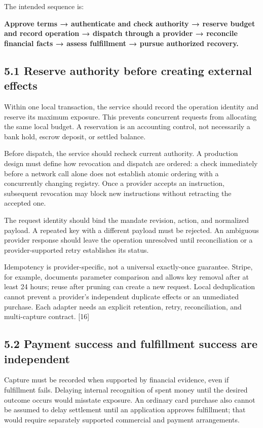 \documentclass[
  11pt,
  letterpaper,
]{article}
\begin{document}
The intended sequence is:

\textbf{Approve terms → authenticate and check authority → reserve
budget and record operation → dispatch through a provider → reconcile
financial facts → assess fulfillment → pursue authorized recovery.}

\subsection{5.1 Reserve authority before creating external
effects}\label{reserve-authority-before-creating-external-effects}

Within one local transaction, the service should record the operation
identity and reserve its maximum exposure. This prevents concurrent
requests from allocating the same local budget. A reservation is an
accounting control, not necessarily a bank hold, escrow deposit, or
settled balance.

Before dispatch, the service should recheck current authority. A
production design must define how revocation and dispatch are ordered: a
check immediately before a network call alone does not establish atomic
ordering with a concurrently changing registry. Once a provider accepts
an instruction, subsequent revocation may block new instructions without
retracting the accepted one.

The request identity should bind the mandate revision, action, and
normalized payload. A repeated key with a different payload must be
rejected. An ambiguous provider response should leave the operation
unresolved until reconciliation or a provider-supported retry
establishes its status.

Idempotency is provider-specific, not a universal exactly-once
guarantee. Stripe, for example, documents parameter comparison and
allows key removal after at least 24 hours; reuse after pruning can
create a new request. Local deduplication cannot prevent a provider's
independent duplicate effects or an unmediated purchase. Each adapter
needs an explicit retention, retry, reconciliation, and multi-capture
contract. {[}16{]}

\subsection{5.2 Payment success and fulfillment success are
independent}\label{payment-success-and-fulfillment-success-are-independent}

Capture must be recorded when supported by financial evidence, even if
fulfillment fails. Delaying internal recognition of spent money until
the desired outcome occurs would misstate exposure. An ordinary card
purchase also cannot be assumed to delay settlement until an application
approves fulfillment; that would require separately supported commercial
and payment arrangements.
\end{document}
